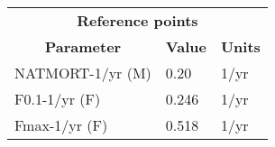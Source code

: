 \begin{tabular}{lll}
\toprule
\multicolumn{3}{c}{\textbf{Reference points}} \\
\multicolumn{1}{c}{\textbf{Parameter}}        & \multicolumn{1}{c}{\textbf{Value}} & \multicolumn{1}{c}{\textbf{Units}} \\
\midrule
NATMORT-1/yr (M) & 0.20  & 1/yr \\
F0.1-1/yr (F)    & 0.246 & 1/yr \\
Fmax-1/yr (F)    & 0.518 & 1/yr \\
\bottomrule
\end{tabular}
